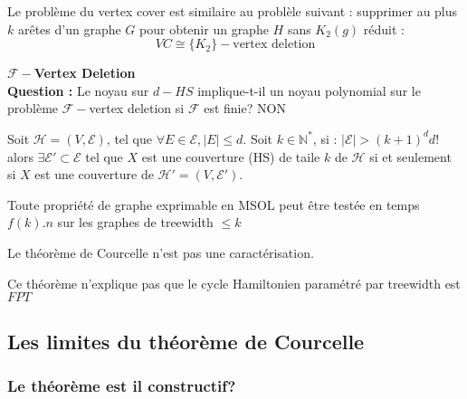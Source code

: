 \documentclass[a4paper, 11pt]{report}
\begin{document}


Le problème du vertex cover est similaire au problèle suivant : supprimer au plus $k$ arêtes d'un
graphe $G$ pour obtenir un graphe $H$ sans $K_2(g)$ réduit :
\begin{displaymath}
VC \cong \{K_2\}-\mbox{vertex deletion}
\end{displaymath}

\textbf{$\mathcal{F}-$Vertex Deletion}\\

\textbf{Question :} Le noyau sur $d-HS$ implique-t-il un noyau polynomial sur le problème
$\mathcal{F}-$vertex deletion si $\mathcal{F}$ est finie? NON

\begin{lemma}
    Soit $\mathcal{H} = (V, \mathcal{E})$, tel que $\forall E \in \mathcal{E}, |E| \leq d$. Soit $k
    \in \mathbb{N}^*$, si : $|\mathcal{E}| > (k+1)^d d!$ alors $\exists \mathcal{E}' \subset
    \mathcal{E}$ tel que $X$ est une couverture (HS) de taile $k$ de $\mathcal{H}$ si et seulement
    si $X$ est une couverture de $\mathcal{H}' = (V, \mathcal{E}')$.
\end{lemma}


\begin{thrm}[Courcelle]
    Toute propriété de graphe exprimable en MSOL peut être testée en temps $f(k).n$ sur les graphes
    de treewidth $\leq k$
\end{thrm}

\begin{rq}
    Le théorème de Courcelle n'est pas une caractérisation.
\end{rq}

\begin{ex}
    Ce théorème n'explique pas que le cycle Hamiltonien paramétré par treewidth est $FPT$
\end{ex}

\subsection{Les limites du théorème de Courcelle}

\subsubsection{Le théorème est il constructif?}
\end{document}
